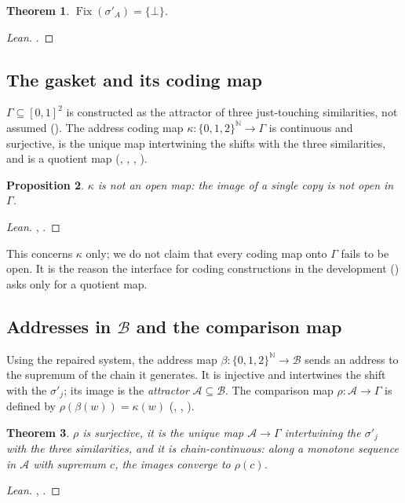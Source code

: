 \documentclass[11pt]{amsart}
\theoremstyle{plain}
\newtheorem{theorem}{Theorem}[section]
\newtheorem{proposition}[theorem]{Proposition}
\theoremstyle{definition}
\newcommand{\Fix}{\operatorname{Fix}}
\newcommand{\BB}{\mathcal{B}}
\newcommand{\GG}{\Gamma}
\begin{document}
\begin{theorem}
$\Fix(\sigma'_A)=\{\bot\}$.
\end{theorem}
\begin{proof}[Lean]
.
\end{proof}

\subsection{The gasket and its coding map}
$\GG\subseteq[0,1]^2$ is constructed as the attractor of three just-touching
similarities, not assumed (). The address coding map
$\kappa\colon\{0,1,2\}^{\mathbb N}\to\GG$ is continuous and surjective, is the
unique map intertwining the shifts with the three similarities, and is a
quotient map (,
, ,
).

\begin{proposition}
$\kappa$ is not an open map: the image of a single copy is not open in $\GG$.
\end{proposition}
\begin{proof}[Lean]
, .
\end{proof}

This concerns $\kappa$ only; we do not claim that every coding map onto $\GG$
fails to be open. It is the reason the interface for coding constructions in
the development () asks only for a quotient map.

\subsection{Addresses in \texorpdfstring{$\BB$}{B} and the comparison map}
Using the repaired system, the address map $\beta\colon\{0,1,2\}^{\mathbb N}\to
\BB$ sends an address to the supremum of the chain it generates. It is
injective and intertwines the shift with the $\sigma'_j$; its image is the
\emph{attractor} $\mathcal A\subseteq\BB$. The comparison map
$\rho\colon\mathcal A\to\GG$ is defined by $\rho(\beta(w))=\kappa(w)$
(, , ).

\begin{theorem}
$\rho$ is surjective, it is the unique map $\mathcal A\to\GG$ intertwining the
$\sigma'_j$ with the three similarities, and it is chain-continuous: along a
monotone sequence in $\mathcal A$ with supremum $c$, the images converge to
$\rho(c)$.
\end{theorem}
\begin{proof}[Lean]
, .
\end{proof}
\end{document}
